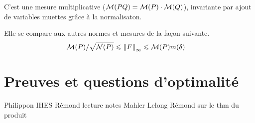 C'est une mesure multiplicative ($\mathcal{M}(PQ) = \mathcal{M}(P) \cdot \mathcal{M}(Q)$),
invariante par ajout de variables muettes grâce à la normalisaton. 

Elle se compare aux autres normes et mesures de la façon suivante.
\begin{align} 
  \mathcal{M}(P) / \sqrt{\mathcal N(P)} 
  & \leqslant \left\lVert F\right\rVert_\infty 
  \leqslant \mathcal{M}(P) m(\delta)
\end{align}

\section{Preuves et questions d'optimalité}

\begin{thebibliography}{9}
   Philippon IHES
   Rémond lecture notes
   Mahler
   Lelong
   Rémond sur le thm du produit
\end{thebibliography}


